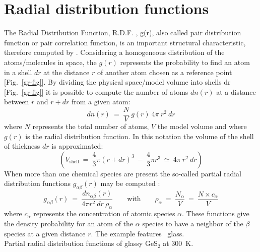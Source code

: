 \section{Radial distribution functions}
\label{rdf}
The Radial Distribution Function, R.D.F. , g(r), also called pair distribution function or pair correlation function, is an important structural characteristic, therefore computed by \atomes.
\laf Considering a homogeneous distribution of the atoms/molecules in space, the $g(r)$ represents the probability to find an atom in a shell $dr$ at the distance $r$ of another atom chosen as a reference point [Fig.~\ref{gr-fig}].
By dividing the physical space/model volume into shells dr [Fig.~\ref{gr-fig}] it is possible to compute the number of atoms $dn(r)$ at a distance between $r$ and $r + dr$ from a given atom: 
\begin{equation}
\label{g2r_1}
dn(r)\ =\ \frac{N}{V}\ g(r)\ 4\pi\ r^{2}\ dr
\end{equation}
where $N$ represents the total number of atoms, $V$ the model volume and where $g(r)$ is the radial distribution function. 
In this notation the volume of the shell of thickness $dr$ is approximated: 
\begin{equation}
\left(V_{\text{shell}}\ =\ \displaystyle{\frac{4}{3}} \pi (r+dr)^3\ -\ \displaystyle{\frac{4}{3}} \pi r^3 \ \simeq\ 4\pi\ r^{2}\ dr \right)
\end{equation}
When more than one chemical species are present the so-called partial radial distribution functions $g_{\alpha\beta}(r)$ may be computed : 
\begin{equation}
\label{g2r_4}
g_{\alpha \beta}(r)\ =\ \frac{dn_{\alpha \beta}(r)}{4\pi r^{2}\ dr\ \rho_{\alpha}} \qquad \text{with} \qquad \rho_{\alpha}\ =\ \frac{N_\alpha}{V}\ =\ \frac{N\times c_\alpha}{V}
\end{equation}
where $c_\alpha$ represents the concentration of atomic species $\alpha$.
\newpage
\noindent These functions give the density probability for an atom of the $\alpha$ species to have a neighbor of the $\beta$ species at a given distance $r$. The example features \ges\ glass. \\
 {Partial radial distribution functions of glassy GeS$_2$ at 300~K.}
